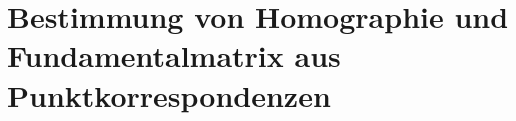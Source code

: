 % 
% 
% 
% 
% 
% 
% 
% 
% 
% 
% 
% 
%
%



\section{Bestimmung von Homographie und Fundamentalmatrix aus Punktkorrespondenzen}
\label{sec:8pointAlg}

